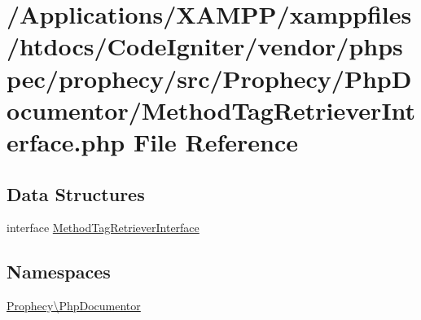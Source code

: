 \hypertarget{_method_tag_retriever_interface_8php}{}\section{/\+Applications/\+X\+A\+M\+P\+P/xamppfiles/htdocs/\+Code\+Igniter/vendor/phpspec/prophecy/src/\+Prophecy/\+Php\+Documentor/\+Method\+Tag\+Retriever\+Interface.php File Reference}
\label{_method_tag_retriever_interface_8php}
\subsection*{Data Structures}
\begin{DoxyCompactItemize}
\item 
interface \mbox{\hyperlink{interface_prophecy_1_1_php_documentor_1_1_method_tag_retriever_interface}{Method\+Tag\+Retriever\+Interface}}
\end{DoxyCompactItemize}
\subsection*{Namespaces}
\begin{DoxyCompactItemize}
\item 
 \mbox{\hyperlink{namespace_prophecy_1_1_php_documentor}{Prophecy\textbackslash{}\+Php\+Documentor}}
\end{DoxyCompactItemize}
